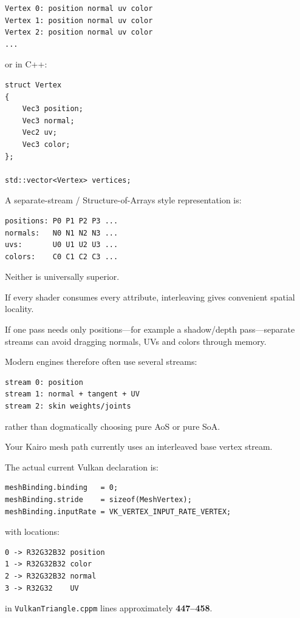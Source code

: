 \begin{verbatim}
Vertex 0: position normal uv color
Vertex 1: position normal uv color
Vertex 2: position normal uv color
...
\end{verbatim}

or in C++:

\begin{verbatim}
struct Vertex
{
    Vec3 position;
    Vec3 normal;
    Vec2 uv;
    Vec3 color;
};

std::vector<Vertex> vertices;
\end{verbatim}

A separate-stream / Structure-of-Arrays style representation is:

\begin{verbatim}
positions: P0 P1 P2 P3 ...
normals:   N0 N1 N2 N3 ...
uvs:       U0 U1 U2 U3 ...
colors:    C0 C1 C2 C3 ...
\end{verbatim}

Neither is universally superior.

If every shader consumes every attribute, interleaving gives convenient spatial locality.

If one pass needs only positions---for example a shadow/depth pass---separate streams can avoid dragging normals, UVs and colors through memory.

Modern engines therefore often use several streams:

\begin{verbatim}
stream 0: position
stream 1: normal + tangent + UV
stream 2: skin weights/joints
\end{verbatim}

rather than dogmatically choosing pure AoS or pure SoA.

Your Kairo mesh path currently uses an interleaved base vertex stream.

The actual current Vulkan declaration is:

\begin{verbatim}
meshBinding.binding   = 0;
meshBinding.stride    = sizeof(MeshVertex);
meshBinding.inputRate = VK_VERTEX_INPUT_RATE_VERTEX;
\end{verbatim}

with locations:

\begin{verbatim}
0 -> R32G32B32 position
1 -> R32G32B32 color
2 -> R32G32B32 normal
3 -> R32G32    UV
\end{verbatim}

in \texttt{VulkanTriangle.cppm} lines approximately \textbf{447--458}.


